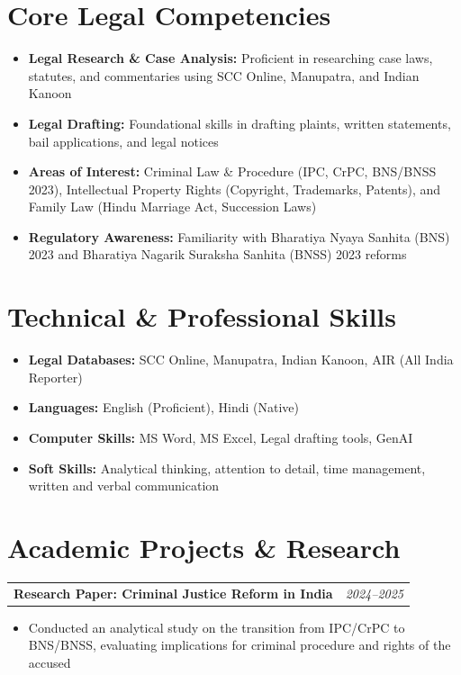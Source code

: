 \documentclass[10pt, a4paper]{article}
\makeatletter
\newcommand{\cventry}[2]{%
  \noindent
  \begin{tabularx}{\linewidth}{@{}X r@{}}
    \textbf{\small\color{darktext}#1} &
    \textit{\footnotesize\color{graytext}#2}
  \end{tabularx}\vspace{1pt}%
}
\makeatother
\begin{document}
\section{Core Legal Competencies}
\begin{itemize}
  \item \textbf{Legal Research \& Case Analysis:} Proficient in researching case laws, statutes,
        and commentaries using SCC Online, Manupatra, and Indian Kanoon
  \item \textbf{Legal Drafting:} Foundational skills in drafting plaints, written statements,
        bail applications, and legal notices
  \item \textbf{Areas of Interest:} Criminal Law \& Procedure (IPC, CrPC, BNS/BNSS 2023),
        Intellectual Property Rights (Copyright, Trademarks, Patents), and Family Law
        (Hindu Marriage Act, Succession Laws)
  \item \textbf{Regulatory Awareness:} Familiarity with Bharatiya Nyaya Sanhita (BNS) 2023
        and Bharatiya Nagarik Suraksha Sanhita (BNSS) 2023 reforms
\end{itemize}

\section{Technical \& Professional Skills}
\begin{itemize}
  \item \textbf{Legal Databases:} SCC Online, Manupatra, Indian Kanoon, AIR (All India Reporter)
  \item \textbf{Languages:} English (Proficient), Hindi (Native)
  \item \textbf{Computer Skills:} MS Word, MS Excel, Legal drafting tools, GenAI
  \item \textbf{Soft Skills:} Analytical thinking, attention to detail, time management,
        written and verbal communication
\end{itemize}

\section{Academic Projects \& Research}

\cventry{Research Paper: Criminal Justice Reform in India}{2024--2025}
\begin{itemize}
  \item Conducted an analytical study on the transition from IPC/CrPC to BNS/BNSS, evaluating
        implications for criminal procedure and rights of the accused
\end{itemize}
\end{document}
